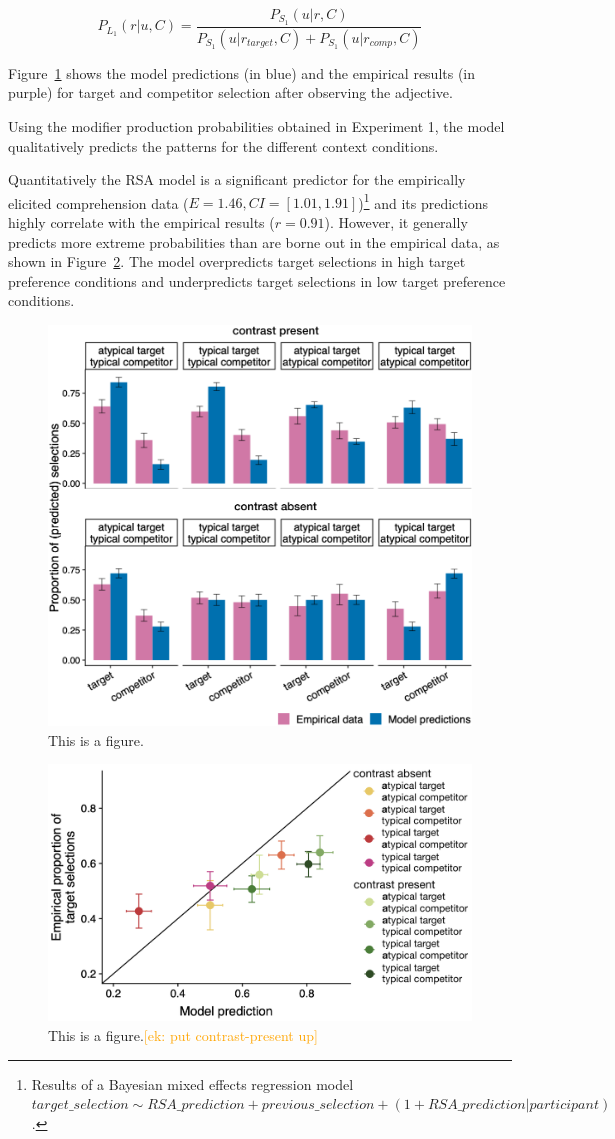\documentclass[10pt,letterpaper]{article}
\newcommand{\ek}[1]{\textcolor{Orange}{[ek: #1]}}
\begin{document}
\begin{equation}
	P_{L_1}(r|u,C) = \frac{P_{S_1}(u|r,C)}{P_{S_1}(u|r_{target},C) + P_{S_1}(u|r_{comp},C)}
\label{eq-flatprior}
\end{equation}

Figure~\ref{model-results-flatprior} shows the model predictions (in blue) and the empirical results (in purple) for target and competitor selection after observing the adjective. 

Using the modifier production probabilities obtained in Experiment 1, the model qualitatively predicts the patterns for the different context conditions. 

Quantitatively the RSA model is a significant predictor for the empirically elicited comprehension data ($E=1.46, CI=[1.01, 1.91]$)\footnote{Results of a Bayesian mixed effects regression model $target\_selection \sim RSA\_prediction + previous\_selection + (1+RSA\_prediction|participant)$.} and its predictions highly correlate with the empirical results ($r=0.91$). However, it generally predicts more extreme probabilities than are borne out in the empirical data, as shown in Figure~\ref{model-results-corr-flatprior}. The model overpredicts target selections in high target preference conditions and underpredicts target selections in low target preference conditions. 

\begin{figure}
	\begin{center}
		\includegraphics[width=.475\textwidth]{graphs/model-bycond-paper.pdf}
	\end{center}
\caption{This is a figure.} 
\label{model-results-flatprior}
\end{figure}

\begin{figure}
	\begin{center}
		\includegraphics[width=.475\textwidth]{graphs/corr-plot.pdf}
	\end{center}
\caption{This is a figure.\ek{put contrast-present up}} 
\label{model-results-corr-flatprior}
\end{figure}
\end{document}
